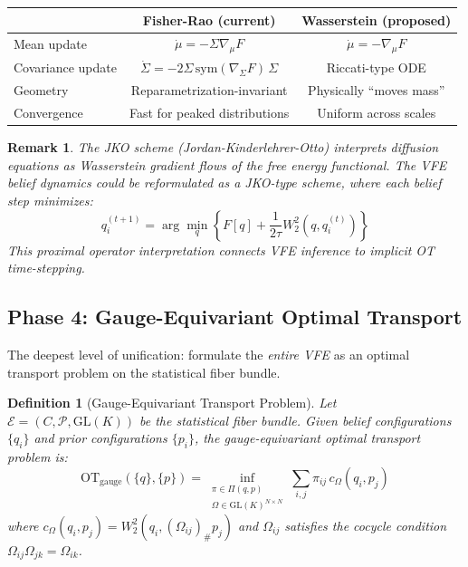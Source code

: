 \documentclass[11pt]{article}
\newtheorem{definition}{Definition}
\newtheorem{remark}{Remark}
\newcommand{\OT}{\mathrm{OT}}
\newcommand{\GL}{\mathrm{GL}}
\begin{document}
\begin{center}
\begin{tabular}{lcc}
\toprule
& \textbf{Fisher-Rao (current)} & \textbf{Wasserstein (proposed)} \\
\midrule
Mean update & $\dot{\mu} = -\Sigma\nabla_\mu F$ & $\dot{\mu} = -\nabla_\mu F$ \\
Covariance update & $\dot{\Sigma} = -2\Sigma\,\text{sym}(\nabla_\Sigma F)\,\Sigma$ & Riccati-type ODE \\
Geometry & Reparametrization-invariant & Physically ``moves mass'' \\
Convergence & Fast for peaked distributions & Uniform across scales \\
\bottomrule
\end{tabular}
\end{center}

\begin{remark}
The JKO scheme (Jordan-Kinderlehrer-Otto) interprets diffusion equations as Wasserstein gradient flows of the free energy functional. The VFE belief dynamics could be reformulated as a JKO-type scheme, where each belief step minimizes:
\[
q_i^{(t+1)} = \arg\min_q \left\{ F[q] + \frac{1}{2\tau}W_2^2(q, q_i^{(t)}) \right\}
\]
This proximal operator interpretation connects VFE inference to implicit OT time-stepping.
\end{remark}

\subsection{Phase 4: Gauge-Equivariant Optimal Transport}

The deepest level of unification: formulate the \emph{entire VFE} as an optimal transport problem on the statistical fiber bundle.

\begin{definition}[Gauge-Equivariant Transport Problem]
Let $\mathcal{E} = (C, \mathcal{P}, \GL(K))$ be the statistical fiber bundle. Given belief configurations $\{q_i\}$ and prior configurations $\{p_i\}$, the gauge-equivariant optimal transport problem is:
\begin{equation}\label{eq:gauge-ot}
\OT_{\text{gauge}}(\{q\}, \{p\}) = \inf_{\substack{\pi \in \Pi(q, p) \\ \Omega \in \GL(K)^{N \times N}}} \sum_{i,j} \pi_{ij}\, c_\Omega(q_i, p_j)
\end{equation}
where $c_\Omega(q_i, p_j) = W_2^2(q_i, (\Omega_{ij})_\# p_j)$ and $\Omega_{ij}$ satisfies the cocycle condition $\Omega_{ij}\Omega_{jk} = \Omega_{ik}$.
\end{definition}
\end{document}
